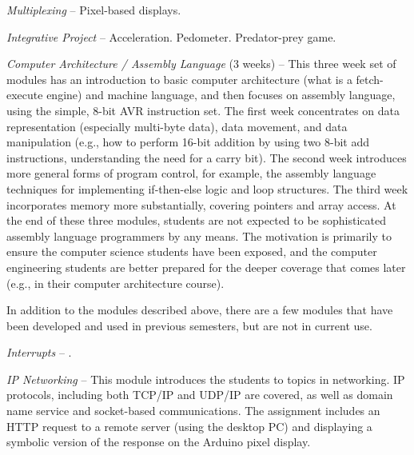 \emph{Multiplexing} -- Pixel-based displays.

\emph{Integrative Project} -- Acceleration. Pedometer. Predator-prey game.

\emph{Computer Architecture / Assembly Language} (3 weeks) -- 
This three week set of modules has an introduction to basic computer
architecture (what is a fetch-execute engine) and machine language, and then
focuses on assembly language, using the simple, 8-bit AVR instruction set.
The first week concentrates on data representation (especially multi-byte
data), data movement, and data manipulation
(e.g., how to perform 16-bit addition by using two 8-bit add instructions,
understanding the need for a carry bit).
The second week introduces more general forms of program control, for example,
the assembly language techniques for implementing if-then-else logic
and loop structures.
The third week incorporates memory more substantially, covering pointers
and array access.
At the end of these three modules, students are not expected to be
sophisticated assembly language programmers by any means.  The motivation
is primarily to ensure the computer science students have been exposed,
and the computer engineering students are better prepared for the deeper
coverage that comes later (e.g., in their computer architecture course).

In addition to the modules described above, there are a few modules that
have been developed and used in previous semesters, but are not in current use.

\emph{Interrupts} --
.

\emph{IP Networking} --
This module introduces the students to topics in networking.  IP protocols,
including both TCP/IP and UDP/IP are covered, as well as domain name service
and socket-based communications. The assignment includes an HTTP request
to a remote server (using the desktop PC) and displaying a symbolic version
of the response on the Arduino pixel display.
